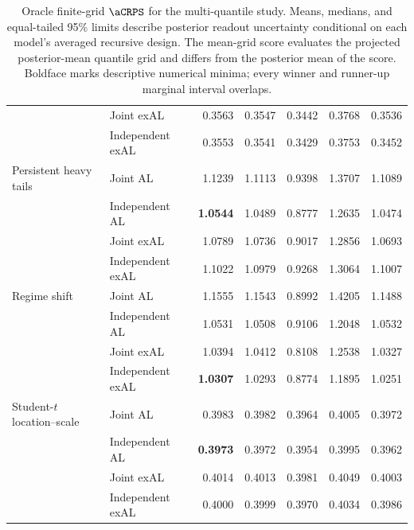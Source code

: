 \begin{table}[p]
\begin{tabular}{@{}>{\raggedright\arraybackslash}p{}>{\raggedright\arraybackslash}p{}rrrrr@{}}
 & Joint exAL & 0.3563 & 0.3547 & 0.3442 & 0.3768 & 0.3536 \\
 & Independent exAL & 0.3553 & 0.3541 & 0.3429 & 0.3753 & 0.3452 \\
\addlinespace[2pt]
Persistent heavy tails & Joint AL & 1.1239 & 1.1113 & 0.9398 & 1.3707 & 1.1089 \\
 & Independent AL & \textbf{1.0544} & 1.0489 & 0.8777 & 1.2635 & 1.0474 \\
 & Joint exAL & 1.0789 & 1.0736 & 0.9017 & 1.2856 & 1.0693 \\
 & Independent exAL & 1.1022 & 1.0979 & 0.9268 & 1.3064 & 1.1007 \\
\addlinespace[2pt]
Regime shift & Joint AL & 1.1555 & 1.1543 & 0.8992 & 1.4205 & 1.1488 \\
 & Independent AL & 1.0531 & 1.0508 & 0.9106 & 1.2048 & 1.0532 \\
 & Joint exAL & 1.0394 & 1.0412 & 0.8108 & 1.2538 & 1.0327 \\
 & Independent exAL & \textbf{1.0307} & 1.0293 & 0.8774 & 1.1895 & 1.0251 \\
\addlinespace[2pt]
Student-\(t\) location--scale & Joint AL & 0.3983 & 0.3982 & 0.3964 & 0.4005 & 0.3972 \\
 & Independent AL & \textbf{0.3973} & 0.3972 & 0.3954 & 0.3995 & 0.3962 \\
 & Joint exAL & 0.4014 & 0.4013 & 0.3981 & 0.4049 & 0.4003 \\
 & Independent exAL & 0.4000 & 0.3999 & 0.3970 & 0.4034 & 0.3986 \\
\bottomrule
\end{tabular}
\caption{Oracle finite-grid \(\aCRPS\) for the multi-quantile study. Means, medians, and equal-tailed 95\% limits describe posterior readout uncertainty conditional on each model's averaged recursive design. The mean-grid score evaluates the projected posterior-mean quantile grid and differs from the posterior mean of the score. Boldface marks descriptive numerical minima; every winner and runner-up marginal interval overlaps.}
\label{tab:joint-qdesn-pure-desn-v2-score}
\end{table}
